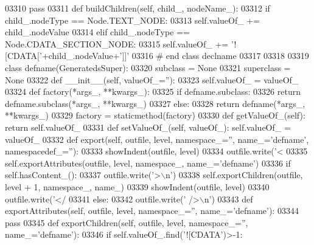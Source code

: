 \begin{DoxyCode}
{{{{{{{{{{{{{{{{{{{{{{{{{{{{{{{{{{{{{{{{{{{{{{{{{{{{{{{{{{{{{{{{{{{{{{{{{{{{{{{{{{{{{{{{{{{{{{{{{{{{{{{{{{{{{{{{{{{{{{{{{{{{{{{{{{{{{{{{{{{{{{{{{{{{{{{{{{{{{{{{{{{{{{{{{{{{{{{{{{{{{{{{{{{{{{{{{{{{{{{{{{{{{{{{{{{{{{{{{{03310         \textcolor{keywordflow}{pass}
03311     \textcolor{keyword}{def }buildChildren(self, child\_, nodeName\_):
03312         \textcolor{keywordflow}{if} child\_.nodeType == Node.TEXT\_NODE:
03313             self.valueOf\_ += child\_.nodeValue
03314         \textcolor{keywordflow}{elif} child\_.nodeType == Node.CDATA\_SECTION\_NODE:
03315             self.valueOf\_ += \textcolor{stringliteral}{'![CDATA['}+child\_.nodeValue+\textcolor{stringliteral}{']]'}
03316 \textcolor{comment}{# end class declname}
03317 
03318 
03319 \textcolor{keyword}{class }defname(GeneratedsSuper):
03320     subclass = \textcolor{keywordtype}{None}
03321     superclass = \textcolor{keywordtype}{None}
03322     \textcolor{keyword}{def }__init__(self, valueOf\_=''):
03323         self.valueOf_ = valueOf\_
03324     \textcolor{keyword}{def }factory(*args\_, **kwargs\_):
03325         \textcolor{keywordflow}{if} defname.subclass:
03326             \textcolor{keywordflow}{return} defname.subclass(*args\_, **kwargs\_)
03327         \textcolor{keywordflow}{else}:
03328             \textcolor{keywordflow}{return} defname(*args\_, **kwargs\_)
03329     factory = staticmethod(factory)
03330     \textcolor{keyword}{def }getValueOf_(self): \textcolor{keywordflow}{return} self.valueOf\_
03331     \textcolor{keyword}{def }setValueOf_(self, valueOf\_): self.valueOf\_ = valueOf\_
03332     \textcolor{keyword}{def }export(self, outfile, level, namespace\_='', name\_='defname', namespacedef\_=''):
03333         showIndent(outfile, level)
03334         outfile.write(\textcolor{stringliteral}{'<%
03335         self.exportAttributes(outfile, level, namespace\_, name\_=\textcolor{stringliteral}{'defname'})
03336         \textcolor{keywordflow}{if} self.hasContent_():
03337             outfile.write(\textcolor{stringliteral}{'>\(\backslash\)n'})
03338             self.exportChildren(outfile, level + 1, namespace\_, name\_)
03339             showIndent(outfile, level)
03340             outfile.write(\textcolor{stringliteral}{'</%
03341         \textcolor{keywordflow}{else}:
03342             outfile.write(\textcolor{stringliteral}{' />\(\backslash\)n'})
03343     \textcolor{keyword}{def }exportAttributes(self, outfile, level, namespace\_='', name\_='defname'):
03344         \textcolor{keywordflow}{pass}
03345     \textcolor{keyword}{def }exportChildren(self, outfile, level, namespace\_='', name\_='defname'):
03346         \textcolor{keywordflow}{if} self.valueOf\_.find(\textcolor{stringliteral}{'![CDATA'})>-1:
}}}}}}}}}}}}}}}}}}}}}}}}}}}}}}}}}}}}}}}}}}}}}}}}}}}}}}}}}}}}}}}}}}}}}}}}}}}}}}}}}}}}}}}}}}}}}}}}}}}}}}}}}}}}}}}}}}}}}}}}}}}}}}}}}}}}}}}}}}}}}}}}}}}}}}}}}}}}}}}}}}}}}}}}}}}}}}}}}}}}}}}}}}}}}}}}}}}}}}}}}}}}}}}}}}}}}}}}}}}}
\end{DoxyCode}
